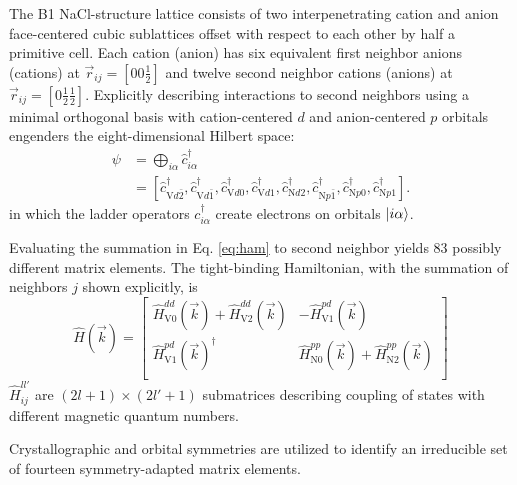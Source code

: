 \documentclass[twocolumn,showpacs,preprintnumbers,superscriptaddress,prb,floatfix,aps,10pt]{revtex4-1}
\newcommand*{\ham}{\hat{H}}
\newcommand*{\bondvec}{\vec{r}_{ij}}
\begin{document}
The B1 NaCl-structure lattice consists of two interpenetrating cation and anion face-centered cubic sublattices offset with respect to each other by half a primitive cell. Each cation (anion) has six equivalent first neighbor anions (cations) at $\bondvec = [0 0 \frac{1}{2}]$ and twelve second neighbor cations (anions) at $\bondvec = [0 \frac{1}{2} \frac{1}{2}]$. Explicitly describing interactions to second neighbors using a minimal orthogonal basis with cation-centered $d$ and anion-centered $p$ orbitals engenders the eight-dimensional Hilbert space:
\begin{align}
\label{eq:hilbert}
\psi &= \bigoplus_{i\alpha} \hat{c}_{i\alpha}^\dag \\
&= \left[ 
  \hat{c}^\dag_{\textrm{V} d \bar{2}},
  \hat{c}^\dag_{\textrm{V} d \bar{1}},
  \hat{c}^\dag_{\textrm{V} d  0},
  \hat{c}^\dag_{\textrm{V} d  1},
  \hat{c}^\dag_{\textrm{N} d  2},
  \hat{c}^\dag_{\textrm{N} p \bar{1}},
  \hat{c}^\dag_{\textrm{N} p  0},
  \hat{c}^\dag_{\textrm{N} p  1}
\right].
\end{align}
%
in which the ladder operators $c^\dag_{i\alpha}$ create electrons on orbitals $\ket{i\alpha}$. %

Evaluating the summation in Eq. \ref{eq:ham} to second neighbor yields 83 possibly different matrix elements. The tight-binding Hamiltonian, with the summation of neighbors $j$ shown explicitly, is
%
\begin{equation}
\label{eq:ham_explicit}
\ham(\vec{k}) = 
\begin{bmatrix}
\ham_{\textrm{V}0}^{dd}(\vec{k}) + \ham_{\textrm{V}2}^{dd}(\vec{k}) & -\ham_{\textrm{V}1}^{pd}(\vec{k}) \\
\ham_{\textrm{V}1}^{pd}(\vec{k})^{\dagger} & \ham_{\textrm{N}0}^{pp}(\vec{k}) + \ham_{\textrm{N}2}^{pp}(\vec{k}) \\
\end{bmatrix}
\end{equation}
$\ham_{ij}^{ll'}$ are $(2l+1) \times (2l'+1)$ submatrices describing coupling of states with different magnetic quantum numbers. 

 Crystallographic and orbital symmetries are utilized to identify an irreducible set of fourteen symmetry-adapted matrix elements. 
 
 
 
\end{document}
